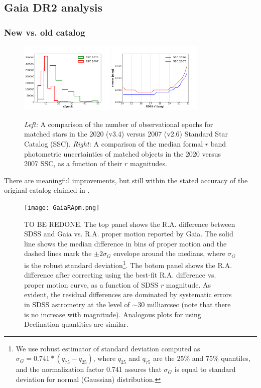  
\subsection{Gaia DR2 analysis}

\subsubsection{New vs. old catalog} 


\begin{figure}[t]
\centering
\includegraphics[width=0.4\textwidth, keepaspectratio]{figures/nepoch_compOvsN.png}
\includegraphics[width=0.4\textwidth, keepaspectratio]{figures/rerr_compOvsN.png}
\caption{{\it Left:} A comparison of the number of observational epochs for matched stars in the 2020 (v3.4) versus 2007 (v2.6) Standard Star Catalog (SSC). {\it Right:} A comparison of the median formal $r$ band photometric uncertainties of matched objects in the 2020 versus 2007 SSC, as a function of their $r$ magnitudes.
\label{fig:rerr_nvso}}
\end{figure}

There are meaningful improvements, but still within the stated accuracy of the original catalog 
claimed in \pO. 

\begin{figure}[t]
\centering
\texttt{[image: GaiaRApm.png]}
\caption{TO BE REDONE. The top panel shows the R.A. difference between SDSS and Gaia 
vs. R.A. proper motion reported by Gaia. The solid line shows the median difference in bins 
of proper motion and the dashed lines mark the $\pm 2 \sigma_G$ envelope around the medians,
where $\sigma_G$ is the robust standard deviation\footnote{We use robust estimator of standard deviation
computed as $\sigma_G = 0.741*(q_{75}-q_{25})$, where $q_{25}$ and $q_{75}$ are the 25\% and 75\% quantiles, 
and the normalization factor 0.741 assures that $\sigma_G$ is equal to standard deviation for normal (Gaussian) 
distribution.}. The botom panel shows the R.A. difference after correcting using the best-fit R.A. difference vs. 
proper motion curve, as a function of SDSS $r$ magnitude. As evident, the residual differences are dominated 
by systematic errors in SDSS astrometry at the level of $\sim30$ milliarcsec (note that there is no increase with 
magnitude). Analogous plots for using Declination quantities are similar. 
\label{fig:GaiaRApm}}
\end{figure}
  

